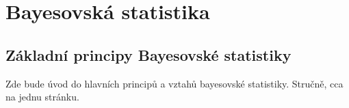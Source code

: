 \chapter{Bayesovská statistika}
\section{Základní principy Bayesovské statistiky}
Zde bude úvod do hlavních principů a vztahů bayesovské statistiky. Stručně, cca na jednu stránku.